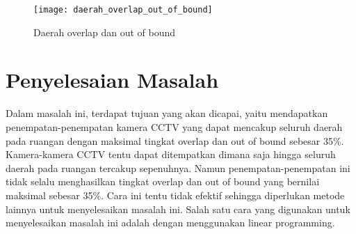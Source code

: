 \begin{figure}[H]
	\centering  
	\texttt{[image: daerah\_overlap\_out\_of\_bound]}
	\caption[Daerah overlap dan out of bound]{Daerah overlap dan out of bound}
	\label{fig:daerah_overlap_out_of_bound}
\end{figure}

\section{Penyelesaian Masalah}
Dalam masalah ini, terdapat tujuan yang akan dicapai, yaitu mendapatkan penempatan-penempatan kamera CCTV yang dapat mencakup seluruh daerah pada ruangan dengan maksimal tingkat overlap dan out of bound sebesar 35\%. Kamera-kamera CCTV tentu dapat ditempatkan dimana saja hingga seluruh daerah pada ruangan tercakup sepenuhnya. Namun penempatan-penempatan ini tidak selalu menghasilkan tingkat overlap dan out of bound yang bernilai maksimal sebesar 35\%. Cara ini tentu tidak efektif sehingga diperlukan metode lainnya untuk menyelesaikan masalah ini. Salah satu cara yang digunakan untuk menyelesaikan masalah ini adalah dengan menggunakan linear programming.

